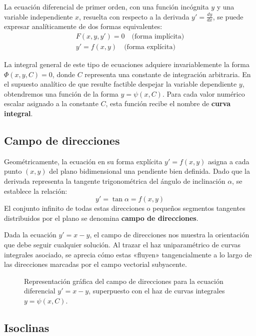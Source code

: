 La ecuación diferencial de primer orden, con una función incógnita $y$ y una variable independiente $x$, resuelta con respecto a la derivada $y' = \frac{dy}{dx}$, se puede expresar analíticamente de dos formas equivalentes:
\begin{gather}
    F(x,y,y') = 0 \quad \text{(forma implícita)} \\
    y' = f(x,y) \quad \text{(forma explícita)}
\end{gather}

La integral general de este tipo de ecuaciones adquiere invariablemente la forma $\Phi(x,y,C) = 0$, donde $C$ representa una constante de integración arbitraria. En el supuesto analítico de que resulte factible despejar la variable dependiente $y$, obtendremos una función de la forma $y = \psi(x,C)$. Para cada valor numérico escalar asignado a la constante $C$, esta función recibe el nombre de \textbf{curva integral}.

\subsection{Campo de direcciones}

Geométricamente, la ecuación en su forma explícita $y' = f(x,y)$ asigna a cada punto $(x,y)$ del plano bidimensional una pendiente bien definida. Dado que la derivada representa la tangente trigonométrica del ángulo de inclinación $\alpha$, se establece la relación:
$$ y' = \tan \alpha = f(x,y) $$
El conjunto infinito de todas estas direcciones o pequeños segmentos tangentes distribuidos por el plano se denomina \textbf{campo de direcciones}. 

\begin{ejemplo}
Dada la ecuación $y' = x - y$, el campo de direcciones nos muestra la orientación que debe seguir cualquier solución. Al trazar el haz uniparamétrico de curvas integrales asociado, se aprecia cómo estas «fluyen» tangencialmente a lo largo de las direcciones marcadas por el campo vectorial subyacente.
\begin{figure}[H]
    \centering
    
    \caption{Representación gráfica del campo de direcciones para la ecuación diferencial $y'=x-y$, superpuesto con el haz de curvas integrales $y = \psi(x,C)$.}
\end{figure}
\end{ejemplo}

\subsection{Isoclinas}


